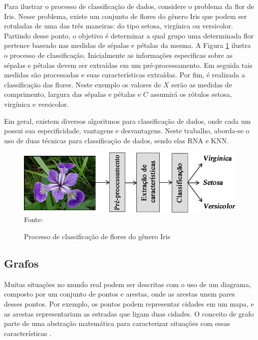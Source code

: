 Para ilustrar o processo de classificação de dados, considere o problema da flor de Iris. Nesse problema, existe um conjunto de flores do gênero Iris que podem ser rotuladas de uma das três maneiras: do tipo setosa, virgínica ou versicolor. Partindo desse ponto, o objetivo é determinar a qual grupo uma determinada flor pertence baseado nas medidas de sépalas e pétalas da mesma. A Figura \ref{fig:irisExample} ilustra o processo de classificação. Inicialmente as informações especificas sobre as sépalas e pétalas devem ser extraídas em um pré-processamento. Em seguida tais medidas são processadas e suas características extraídas. Por fim, é realizada a classificação das flores. Neste exemplo os valores de $X$ serão as medidas de comprimento, largura das sépalas e pétalas e $C$ assumirá os rótulos setosa, virgínica e versicolor.

Em geral, existem diversos algoritmos para classificação de dados, onde cada um possui sua especificidade, vantagens e desvantagens. Neste trabalho, aborda-se o uso de duas técnicas para classificação de dados, sendo elas RNA e KNN.

\begin{figure}[ht!]
\caption{Processo de classificação de flores do gênero Iris}
\label{fig:irisExample}
\centering
\includegraphics[scale=0.5]{img/irisExample.png}
{\fontsize{11pt}{\baselineskip}\selectfont
\\Fonte: \cite{pacheco2016agregaccao}
}
\end{figure}

\subsection{Grafos}
Muitas situações no mundo real podem ser descritas com o uso de um diagrama, composto por um conjunto de pontos e arestas, onde as arestas unem pares desses pontos. Por exemplo, os pontos podem representar cidades em um mapa, e as arestas representariam as estradas que ligam duas cidades. O conceito de grafo parte de uma abstração matemática para caracterizar situações com essas características \citep{Bondy1976}.

